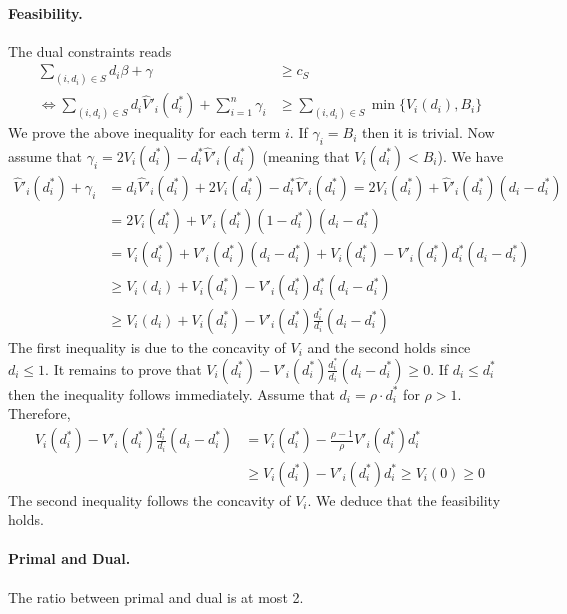 \paragraph{Feasibility.}
The dual constraints reads
\begin{align*}
\sum_{(i,d_{i}) \in S} d_{i} \beta + \gamma &\geq c_{S} \\
%
\Leftrightarrow
\sum_{(i,d_{i}) \in S} d_{i} \hat{V}'_{i}(d^{*}_{i})  + \sum_{i=1}^{n} \gamma_{i} &\geq \sum_{(i,d_{i}) \in S} \min\{V_{i}(d_{i}), B_{i}\}
\end{align*}
%
We prove the above inequality for each term $i$. If $\gamma_{i} = B_{i}$ then it is trivial. Now assume that
$\gamma_{i} = 2 V_{i}(d^{*}_{i}) -   d^{*}_{i} \hat{V}'_{i}(d^{*}_{i})$ (meaning that $V_{i}(d^{*}_{i}) < B_{i}$).
We have
%
\begin{align*}
\hat{V}'_{i}(d^{*}_{i})  + \gamma_{i}
&= d_{i} \hat{V}'_{i}(d^{*}_{i})  + 2 V_{i}(d^{*}_{i}) -   d^{*}_{i} \hat{V}'_{i}(d^{*}_{i})
= 2 V_{i}(d^{*}_{i}) + \hat{V}'_{i}(d^{*}_{i}) (d_{i} - d^{*}_{i}) \\
%
&= 2 V_{i}(d^{*}_{i}) + V'_{i}(d^{*}_{i})(1 - d^{*}_{i}) (d_{i} - d^{*}_{i}) \\
%
&= V_{i}(d^{*}_{i}) + V'_{i}(d^{*}_{i})(d_{i} - d^{*}_{i}) + V_{i}(d^{*}_{i})  - V'_{i}(d^{*}_{i}) d^{*}_{i} (d_{i} - d^{*}_{i}) \\
%
&\geq V_{i}(d_{i}) + V_{i}(d^{*}_{i})  - V'_{i}(d^{*}_{i}) d^{*}_{i} (d_{i} - d^{*}_{i}) \\
%
&\geq V_{i}(d_{i}) + V_{i}(d^{*}_{i})  - V'_{i}(d^{*}_{i}) \frac{d^{*}_{i}}{d_{i}} (d_{i} - d^{*}_{i})
\end{align*}
The first inequality is due to the concavity of $V_{i}$ and the second holds since $d_{i} \leq 1$.
It remains to prove that $V_{i}(d^{*}_{i})  - V'_{i}(d^{*}_{i}) \frac{d^{*}_{i}}{d_{i}} (d_{i} - d^{*}_{i}) \geq 0$.
If $d_{i} \leq d^{*}_{i}$ then the inequality follows immediately. Assume that $d_{i} = \rho \cdot d^{*}_{i}$ for $\rho > 1$.
Therefore,
\begin{align*}
V_{i}(d^{*}_{i})  - V'_{i}(d^{*}_{i}) \frac{d^{*}_{i}}{d_{i}} (d_{i} - d^{*}_{i})
&= V_{i}(d^{*}_{i})  - \frac{\rho - 1}{\rho} V'_{i}(d^{*}_{i}) d^{*}_{i} \\
%
&\geq V_{i}(d^{*}_{i})  - V'_{i}(d^{*}_{i}) d^{*}_{i} \geq V_{i}(0) \geq 0
\end{align*}
The second inequality follows the concavity of $V_{i}$. We deduce that the feasibility holds.

\paragraph{Primal and Dual.}
The ratio between primal and dual is at most 2.

